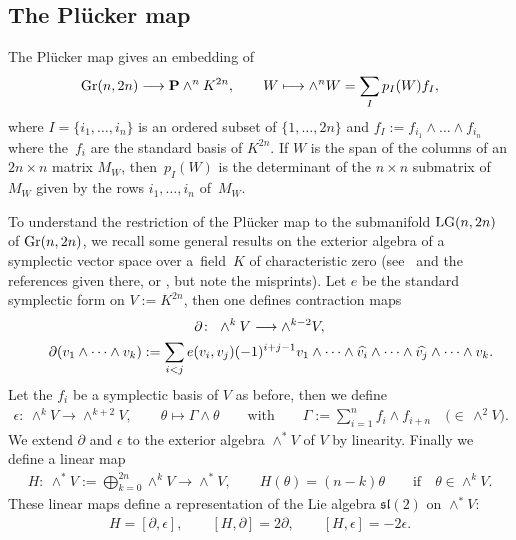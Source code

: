 \documentclass[pdftex]{sigma}
\newcommand{\PP}{{\bf P}}
\numberwithin{equation}{section}
\begin{document}
\subsection{The Pl\"ucker map}\label{pluc}
The Pl\"ucker map gives an embedding of
\begin{gather*}
{\rm Gr}(n,2n) \longrightarrow \PP \wedge^n K^{2n}, \qquad W \longmapsto \wedge^nW = \sum_I p_I(W)f_I,
\end{gather*}
where $I=\{i_1,\ldots,i_n\}$ is an ordered subset of $\{1,\ldots,2n\}$ and $f_I:=f_{i_1}\wedge\dots\wedge f_{i_n}$ where the~$f_i$ are the standard basis of $K^{2n}$. If $W$ is the span of the columns of an $2n\times n$ matrix $M_W$, then~$p_I(W)$ is the determinant of the $n\times n$ submatrix of~$M_W$ given by the rows $i_1,\ldots,i_n$ of~$M_W$.

To understand the restriction of the Pl\"ucker map to the submanifold ${\rm LG}(n,2n)$ of ${\rm Gr}(n,2n)$, we recall some general results on the exterior algebra of a symplectic vector space over a~field~$K$ of characteristic zero (see~\cite{Gow} and the references given there, or \cite[Section~11.6.7]{P}, but note the misprints). Let $e$ be the standard symplectic form on $V:=K^{2n}$, then one defines contraction maps
\begin{gather*}
\partial\colon \ \wedge^kV \longrightarrow \wedge^{k-2} V,\\
\hphantom{\partial\colon}{} \ \partial(v_1\wedge\cdots\wedge v_k) := \sum_{i<j}e(v_i,v_j)(-1)^{i+j-1}
v_1\wedge\cdots\wedge \widehat{v_i}\wedge\cdots\wedge\widehat{v_j}\wedge\cdots\wedge v_k.
\end{gather*}
Let the $f_i$ be a symplectic basis of $V$ as before, then we define
\begin{gather*}
\epsilon\colon \ \wedge^k V \longrightarrow \wedge^{k+2}V,\qquad \theta\longmapsto \Gamma\wedge\theta
\qquad\text{with}\qquad \Gamma := \sum_{i=1}^nf_i\wedge f_{i+n}\quad\big({\in}\, \wedge^2 V\big).
\end{gather*}
We extend $\partial$ and $\epsilon$ to the exterior algebra $\wedge^*V$ of $V$ by linearity. Finally we define a linear map
\begin{gather*}
H\colon \ \wedge^*V := \bigoplus_{k=0}^{2n}\wedge^kV \longrightarrow \wedge^*V,\qquad
H(\theta) = (n-k)\theta\qquad\text{if}\quad\theta\in\wedge^kV.
\end{gather*}
These linear maps define a representation of the Lie algebra ${\mathfrak{sl}}(2)$ on $\wedge^*V$:
\begin{gather*}
H = [\partial,\epsilon],\qquad [H,\partial] = 2\partial,\qquad [H,\epsilon]=-2\epsilon.
\end{gather*}
\end{document}
